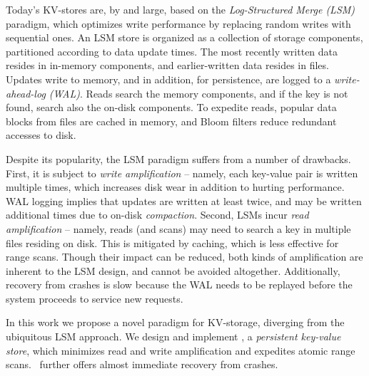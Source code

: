 Today's KV-stores are, by and large, based on the \emph{Log-Structured Merge (LSM)} paradigm, which 
optimizes write performance by replacing random writes with sequential ones.  
An LSM store is organized as a collection of storage components, partitioned according to data update times. 
The most recently written data resides in  in-memory components, and earlier-written data resides in files.  
Updates write to  memory, and in addition, for persistence, are 
 logged to a \emph{write-ahead-log (WAL)}. 
 Reads search the memory components, and if the key is not found, search also the on-disk components.  
To expedite reads, popular data blocks from files are cached in memory,
and Bloom filters  reduce redundant accesses to disk.  
 
Despite its popularity, the LSM paradigm suffers from a number of drawbacks.
First, it is subject to \emph{write amplification} -- namely, each key-value pair is written multiple times, which 
increases disk wear in addition to hurting performance. 
WAL logging implies that updates 
 are written at least twice, and may be written additional times due to on-disk \emph{compaction}.
Second, LSMs incur \emph{read amplification} -- 
namely, reads (and scans) may need to search a key in multiple files residing on disk. 
% 
This 
is mitigated by caching, which is  less effective for range scans.  
Though their impact can be reduced, both kinds of amplification are inherent to the LSM design, and cannot be avoided altogether. 
Additionally, recovery from crashes is slow  because the WAL needs to be replayed before the system proceeds to service new requests. 

In this work we propose a novel paradigm for KV-storage, diverging from the ubiquitous LSM approach.  
We design and implement  \sys,  a \emph{persistent key-value store}, which minimizes read and write
amplification and expedites atomic range scans. 
 \sys\ further offers almost immediate recovery from  crashes. 
 

